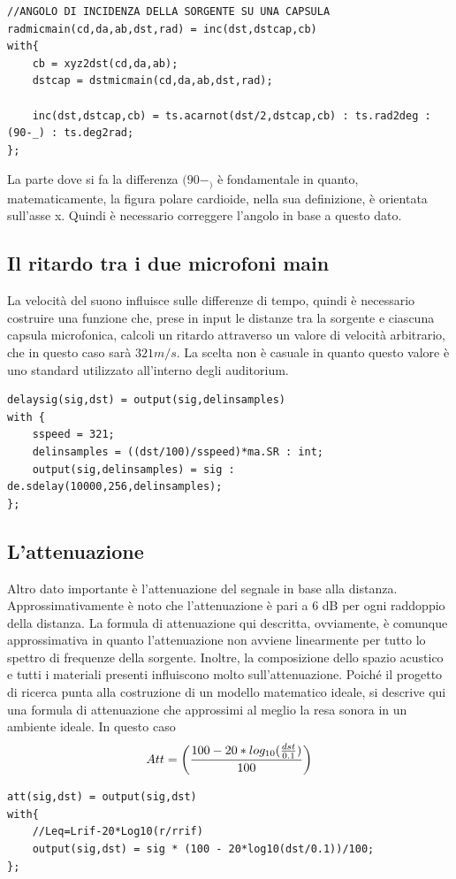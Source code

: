 \documentclass{article}
\begin{document}
    \begin{lstlisting}
//ANGOLO DI INCIDENZA DELLA SORGENTE SU UNA CAPSULA
radmicmain(cd,da,ab,dst,rad) = inc(dst,dstcap,cb)
with{
    cb = xyz2dst(cd,da,ab);
    dstcap = dstmicmain(cd,da,ab,dst,rad);
    
    inc(dst,dstcap,cb) = ts.acarnot(dst/2,dstcap,cb) : ts.rad2deg : (90-_) : ts.deg2rad;
};
    \end{lstlisting}

    La parte dove si fa la differenza $(90-_)$ è fondamentale in quanto, matematicamente, la figura polare cardioide, nella sua definizione, è orientata sull'asse x. Quindi è necessario correggere l'angolo in base a questo dato.\\
\subsection{Il ritardo tra i due microfoni main}
    La velocità del suono influisce sulle differenze di tempo, quindi è necessario costruire una funzione che, prese in input le distanze tra la sorgente e ciascuna capsula microfonica, calcoli un ritardo attraverso un valore di velocità arbitrario, che in questo caso sarà $321 m/s$. La scelta non è casuale in quanto questo valore è uno standard utilizzato all'interno degli auditorium.

    \begin{lstlisting}
delaysig(sig,dst) = output(sig,delinsamples)
with {
    sspeed = 321;
    delinsamples = ((dst/100)/sspeed)*ma.SR : int;
    output(sig,delinsamples) = sig : de.sdelay(10000,256,delinsamples);
};
    \end{lstlisting}
    
\subsection{L'attenuazione}
    Altro dato importante è l'attenuazione del segnale in base alla distanza. Approssimativamente è noto che l'attenuazione è pari a 6 dB per ogni raddoppio della distanza. La formula di attenuazione qui descritta, ovviamente, è comunque approssimativa in quanto l'attenuazione non avviene linearmente per tutto lo spettro di frequenze della sorgente. Inoltre, la composizione dello spazio acustico e tutti i materiali presenti influiscono molto sull'attenuazione. Poiché il progetto di ricerca punta alla costruzione di un modello matematico ideale, si descrive qui una formula di attenuazione che approssimi al meglio la resa sonora in un ambiente ideale. In questo caso\\
    $$Att = \biggl({100 - 20*log_{10}(\frac{dst}{0.1})\over100} \biggr)$$
\begin{lstlisting}
att(sig,dst) = output(sig,dst)
with{
    //Leq=Lrif-20*Log10(r/rrif)
    output(sig,dst) = sig * (100 - 20*log10(dst/0.1))/100;
};
\end{lstlisting}
\end{document}
